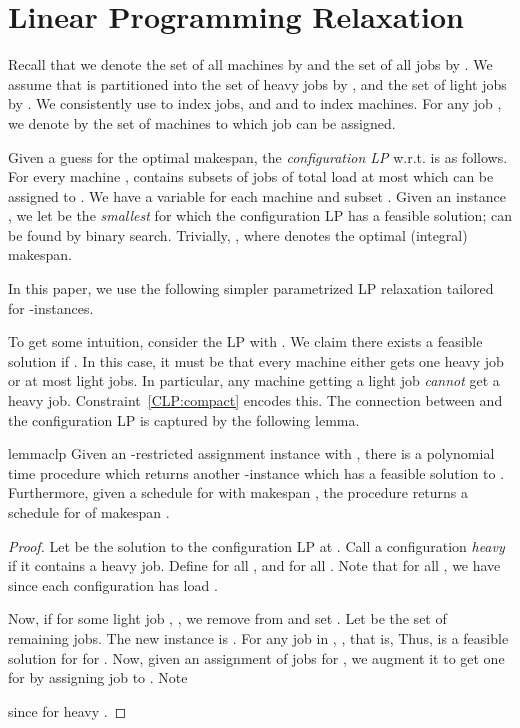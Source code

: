 \documentclass[11pt]{article}
\begin{document}
\section{Linear Programming Relaxation}
\label{sec:LP}

Recall that we denote the set of all machines by  and the set of all jobs by . We assume that  is partitioned into the set of heavy jobs by , and the set of light jobs by .  We consistently use  to index jobs, and  and  to index machines. For any job , we denote by  the set of machines to which job  can be assigned.

Given a guess  for the optimal makespan, the {\em configuration LP} w.r.t.  is as follows. For every machine ,  contains subsets of jobs of total load at most  which can be assigned to  . We have a variable  for each machine  and subset . 
\noindent
Given an instance , we let  be the {\em smallest}  for which the configuration LP has a feasible solution;  can be found by binary search.
Trivially, , where  denotes the optimal (integral) makespan. 


In this paper, we use the following simpler parametrized LP relaxation  tailored for -instances. 
\ifdefined\CR

\else
\begin{minipage}{0.37\textwidth}

\end{minipage}
\begin{minipage}{0.58\textwidth}

\end{minipage}
\fi

\medskip
To get some intuition, 
consider the LP with .
We claim there exists a  feasible solution if . In this case, it must be that every machine either gets one heavy job or 
at most  light jobs. In particular, any machine getting a light job {\em cannot} get a heavy job.
Constraint~\eqref{CLP:compact} encodes this. The connection between  and the configuration LP is captured by the following lemma.
\begin{restatable}{lemma}{clp}
\label{lemma:reduce-to-feasible-instances}
\label{lem:reduce-to-feasible-instances}
Given an -restricted assignment instance  with , there is a polynomial time procedure which 
returns another -instance  which has a feasible solution to .
Furthermore, given a schedule for  with makespan , the procedure returns a schedule for  of makespan .
\end{restatable}

\begin{proof}
Let  be the solution to the configuration LP at .
Call a configuration  {\em heavy} if it contains a heavy job. Define
 for all , and  for all .
Note that  for all , we have 
 since each configuration has load .

Now, if for some light job , , we remove  from  and set . 
Let  be the set of remaining jobs. The new instance is .
For any job  in , 
, that is, 
Thus,   is a feasible solution for  for . Now, given an assignment of jobs for , we augment it to get one for  by assigning job  to .
Note
\ifdefined\CR

\else

\fi
since  for heavy .
\end{proof}
\end{document}
